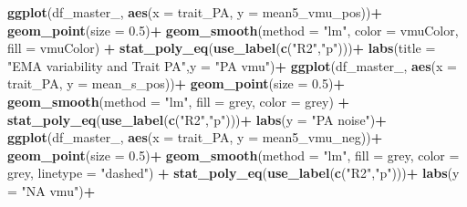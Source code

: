 \documentclass[
]{article}
\newenvironment{Shaded}{\begin{snugshade}}{\end{snugshade}}
\newcommand{\AttributeTok}[1]{\textcolor[rgb]{0.13,0.29,0.53}{#1}}
\newcommand{\FloatTok}[1]{\textcolor[rgb]{0.00,0.00,0.81}{#1}}
\newcommand{\FunctionTok}[1]{\textcolor[rgb]{0.13,0.29,0.53}{\textbf{#1}}}
\newcommand{\NormalTok}[1]{#1}
\newcommand{\SpecialCharTok}[1]{\textcolor[rgb]{0.81,0.36,0.00}{\textbf{#1}}}
\newcommand{\StringTok}[1]{\textcolor[rgb]{0.31,0.60,0.02}{#1}}
\begin{document}
\begin{Shaded}
\begin{Highlighting}[]
\FunctionTok{ggplot}\NormalTok{(df\_master\_, }\FunctionTok{aes}\NormalTok{(}\AttributeTok{x =}\NormalTok{ trait\_PA, }\AttributeTok{y =}\NormalTok{ mean5\_vmu\_pos))}\SpecialCharTok{+}
  \FunctionTok{geom\_point}\NormalTok{(}\AttributeTok{size =} \FloatTok{0.5}\NormalTok{)}\SpecialCharTok{+}
  \FunctionTok{geom\_smooth}\NormalTok{(}\AttributeTok{method =} \StringTok{"lm"}\NormalTok{, }\AttributeTok{color =}\NormalTok{ vmuColor, }\AttributeTok{fill =}\NormalTok{ vmuColor) }\SpecialCharTok{+}
  \FunctionTok{stat\_poly\_eq}\NormalTok{(}\FunctionTok{use\_label}\NormalTok{(}\FunctionTok{c}\NormalTok{(}\StringTok{"R2"}\NormalTok{,}\StringTok{"p"}\NormalTok{)))}\SpecialCharTok{+}
  \FunctionTok{labs}\NormalTok{(}\AttributeTok{title =} \StringTok{"EMA variability and Trait PA"}\NormalTok{,}\AttributeTok{y =} \StringTok{"PA vmu"}\NormalTok{)}\SpecialCharTok{+}
\FunctionTok{ggplot}\NormalTok{(df\_master\_, }\FunctionTok{aes}\NormalTok{(}\AttributeTok{x =}\NormalTok{ trait\_PA, }\AttributeTok{y =}\NormalTok{ mean\_s\_pos))}\SpecialCharTok{+}
  \FunctionTok{geom\_point}\NormalTok{(}\AttributeTok{size =} \FloatTok{0.5}\NormalTok{)}\SpecialCharTok{+}
  \FunctionTok{geom\_smooth}\NormalTok{(}\AttributeTok{method =} \StringTok{"lm"}\NormalTok{, }\AttributeTok{fill =} \StringTok{\textquotesingle{}grey\textquotesingle{}}\NormalTok{, }\AttributeTok{color =} \StringTok{\textquotesingle{}grey\textquotesingle{}}\NormalTok{) }\SpecialCharTok{+}
  \FunctionTok{stat\_poly\_eq}\NormalTok{(}\FunctionTok{use\_label}\NormalTok{(}\FunctionTok{c}\NormalTok{(}\StringTok{"R2"}\NormalTok{,}\StringTok{"p"}\NormalTok{)))}\SpecialCharTok{+}
  \FunctionTok{labs}\NormalTok{(}\AttributeTok{y =} \StringTok{"PA noise"}\NormalTok{)}\SpecialCharTok{+}
\FunctionTok{ggplot}\NormalTok{(df\_master\_, }\FunctionTok{aes}\NormalTok{(}\AttributeTok{x =}\NormalTok{ trait\_PA, }\AttributeTok{y =}\NormalTok{ mean5\_vmu\_neg))}\SpecialCharTok{+}
  \FunctionTok{geom\_point}\NormalTok{(}\AttributeTok{size =} \FloatTok{0.5}\NormalTok{)}\SpecialCharTok{+}
  \FunctionTok{geom\_smooth}\NormalTok{(}\AttributeTok{method =} \StringTok{"lm"}\NormalTok{, }\AttributeTok{fill =} \StringTok{\textquotesingle{}grey\textquotesingle{}}\NormalTok{, }\AttributeTok{color =} \StringTok{\textquotesingle{}grey\textquotesingle{}}\NormalTok{, }\AttributeTok{linetype =} \StringTok{"dashed"}\NormalTok{) }\SpecialCharTok{+}
  \FunctionTok{stat\_poly\_eq}\NormalTok{(}\FunctionTok{use\_label}\NormalTok{(}\FunctionTok{c}\NormalTok{(}\StringTok{"R2"}\NormalTok{,}\StringTok{"p"}\NormalTok{)))}\SpecialCharTok{+}
  \FunctionTok{labs}\NormalTok{(}\AttributeTok{y =} \StringTok{"NA vmu"}\NormalTok{)}\SpecialCharTok{+}

\end{Highlighting}
\end{Shaded}
\end{document}
